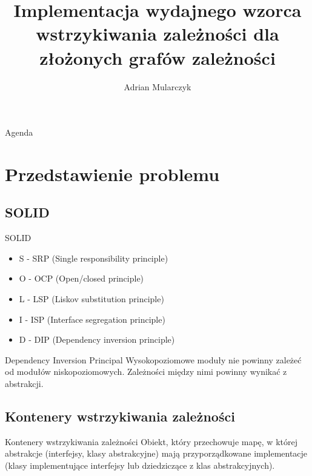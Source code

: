 \documentclass{beamer}
\title[]
{Implementacja wydajnego wzorca wstrzykiwania zależności dla złożonych grafów zależności}
\author[Adrian Mularczyk]
{Adrian Mularczyk}
\institute[Uniwersytet Wrocławski]
{
Uniwersytet Wrocławski\\
Wydział Matematyki i Informatyki\\
Kierunek: Informatyka
}
\date{}
\begin{document}
\begin{frame}
  \titlepage
\end{frame}

\begin{frame}{Agenda}
  \tableofcontents
\end{frame}



\section{Przedstawienie problemu}

\subsection*{SOLID}

\begin{frame}{SOLID}
\begin{itemize}
	\item S - SRP (Single responsibility principle)
	\item O - OCP (Open/closed principle)
	\item L - LSP (Liskov substitution principle)
	\item I - ISP (Interface segregation principle)
	\item D - DIP (Dependency inversion principle)
\end{itemize}
\end{frame}

\begin{frame}{Dependency Inversion Principal}
Wysokopoziomowe moduły nie powinny zależeć od modułów niskopoziomowych. Zależności między nimi powinny wynikać z abstrakcji.
\end{frame}


\subsection*{Kontenery wstrzykiwania zależności}

\begin{frame}{Kontenery wstrzykiwania zależności}
Obiekt, który przechowuje mapę, w której abstrakcje (interfejsy, klasy abstrakcyjne) mają przyporządkowane implementacje (klasy implementujące interfejsy lub dziedziczące z klas abstrakcyjnych).
\end{frame}
\end{document}
